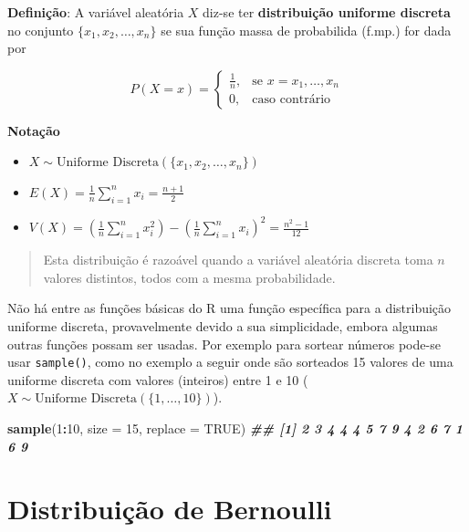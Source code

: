 \documentclass[
]{book}
\newenvironment{Shaded}{\begin{snugshade}}{\end{snugshade}}
\newcommand{\AttributeTok}[1]{\textcolor[rgb]{0.13,0.29,0.53}{#1}}
\newcommand{\ConstantTok}[1]{\textcolor[rgb]{0.56,0.35,0.01}{#1}}
\newcommand{\DecValTok}[1]{\textcolor[rgb]{0.00,0.00,0.81}{#1}}
\newcommand{\DocumentationTok}[1]{\textcolor[rgb]{0.56,0.35,0.01}{\textbf{\textit{#1}}}}
\newcommand{\FunctionTok}[1]{\textcolor[rgb]{0.13,0.29,0.53}{\textbf{#1}}}
\newcommand{\NormalTok}[1]{#1}
\newcommand{\SpecialCharTok}[1]{\textcolor[rgb]{0.81,0.36,0.00}{\textbf{#1}}}
\providecommand{\tightlist}{%
  \setlength{\itemsep}{0pt}\setlength{\parskip}{0pt}}
\begin{document}
\textbf{Definição}: A variável aleatória \(X\) diz-se ter \textbf{distribuição uniforme discreta} no conjunto \(\{x_1, x_2, \dots, x_n\}\) se sua função massa de probabilida (f.mp.) for dada por

\[
P(X = x) = 
\begin{cases}
\frac{1}{n}, & \text{se } x = x_1, \dots, x_n \\
0, & \text{caso contrário}
\end{cases}
\]

\textbf{Notação}

\begin{itemize}
\tightlist
\item
  \(X \sim \text{Uniforme Discreta} (\{x_1, x_2, \dots, x_n\})\)
\item
  \(E(X) = \frac{1}{n} \sum_{i=1}^{n} x_i = \frac{n+1}{2}\)
\item
  \(V(X) = \left(\frac{1}{n} \sum_{i=1}^{n} x_i^2\right) - \left(\frac{1}{n} \sum_{i=1}^{n} x_i \right)^2 = \frac{n^2 - 1}{12}\)
\end{itemize}

\begin{quote}
Esta distribuição é razoável quando a variável aleatória discreta toma \(n\) valores distintos, todos com a mesma probabilidade.
\end{quote}

Não há entre as funções básicas do R uma função específica para a distribuição uniforme discreta, provavelmente devido a sua simplicidade, embora algumas outras funções possam ser usadas. Por exemplo para sortear números pode-se usar \texttt{sample()}, como no exemplo a seguir onde são sorteados 15 valores de uma uniforme discreta com valores (inteiros) entre 1 e 10 (\(X\sim \text{Uniforme Discreta}(\{1,\ldots,10\})\)).

\begin{Shaded}
\begin{Highlighting}[]
\FunctionTok{sample}\NormalTok{(}\DecValTok{1}\SpecialCharTok{:}\DecValTok{10}\NormalTok{, }\AttributeTok{size =} \DecValTok{15}\NormalTok{, }\AttributeTok{replace =} \ConstantTok{TRUE}\NormalTok{)}
\DocumentationTok{\#\# [1] 2 3 4 4 4 5 7 9 4 2 6 7 1 6 9}
\end{Highlighting}
\end{Shaded}

\section{Distribuição de Bernoulli}\label{distribuiuxe7uxe3o-de-bernoulli}
\end{document}
